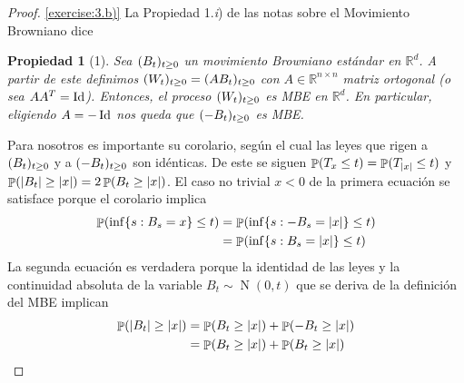 \documentclass{article}
\DeclareMathOperator{\prob}{\mathbb{P}}
\DeclareMathOperator{\normal}{N}
\DeclareMathOperator{\identity}{\textnormal{Id}}
\newcommand{\realnum}{\mathbb{R}}
\newcommand{\transpose}[1]{#1^T}
\newtheorem{property}{Propiedad}
\theoremstyle{definition}
\begin{document}
\begin{proof} \ref{exercise:3.b)}
La Propiedad 1.\textit{i}) de las notas sobre el Movimiento Browniano dice
\begin{property}[1]
\label{NotasMovimientoBrowniano_property:1}
Sea \((B_t)_{t \geq 0}\) un movimiento Browniano estándar en \(\realnum^d\).
A partir de este definimos \((W_t)_{t \geq 0} = (A B_t)_{t \geq 0}\) con \(A \in \realnum^{n \times n}\) matriz ortogonal (o sea \(A \transpose{A} = \identity\)).
Entonces, el proceso \((W_t)_{t \geq 0}\) es MBE en \(\realnum^d\).
En particular, eligiendo \(A = - \identity\) nos queda que \((- B_t)_{t \geq 0}\) es MBE.
\end{property}
Para nosotros es importante su corolario, según el cual las leyes que rigen a \((B_t)_{t \geq 0}\) y a \((- B_t)_{t \geq 0}\) son idénticas.
De este se siguen \(\prob(T_x \leq t) = \prob(T_{\abs{x}} \leq t)\) y \(\prob(\abs{\brownian_t} \geq \abs{x}) = 2 \prob(\brownian_t \geq \abs{x})\).
El caso no trivial \(x < 0\) de la primera ecuación se satisface porque el corolario implica
\begin{align}
	\prob(\inf\{s : B_s = x\} \leq t)
	&=
	\prob(\inf\{s : - B_s = \abs{x}\} \leq t)
	\\
	&=
	\prob(\inf\{s : B_s = \abs{x}\} \leq t)
\end{align}
La segunda ecuación es verdadera porque la identidad de las leyes y la continuidad absoluta de la variable \(B_t \sim \normal (0, t)\) que se deriva de la definición del MBE implican
\begin{align}
	\prob(\abs{\brownian_t} \geq \abs{x})
	&=
	\prob(\brownian_t \geq \abs{x}) + \prob(- \brownian_t \geq \abs{x})
	\\
	&= 
	\prob(\brownian_t \geq \abs{x}) + \prob(\brownian_t \geq \abs{x})
\end{align}



\end{proof}
\end{document}
